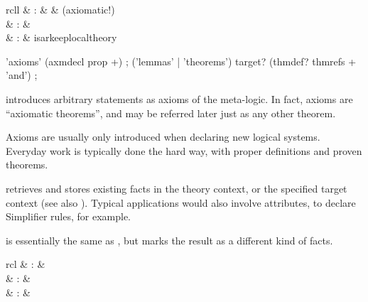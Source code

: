 \begin{isabellebody}
\begin{isamarkuptext}
\begin{descr}
  \end{descr}%
\end{isamarkuptext}%
\isamarkuptrue%
%
\isamarkuptrue%
%
\begin{isamarkuptext}%
\begin{matharray}{rcll}
     & : &  & (axiomatic!) \\
     & : &  \\
     & : & isarkeep{local{\dsh}theory} \\
  \end{matharray}

  \begin{rail}
    'axioms' (axmdecl prop +)
    ;
    ('lemmas' | 'theorems') target? (thmdef? thmrefs + 'and')
    ;
  \end{rail}

  \begin{descr}
  
  \item [\isa{\isacommand{axioms}}~\isa{a{\isacharcolon}\ {\isasymphi}}] introduces arbitrary
  statements as axioms of the meta-logic.  In fact, axioms are
  ``axiomatic theorems'', and may be referred later just as any other
  theorem.
  
  Axioms are usually only introduced when declaring new logical
  systems.  Everyday work is typically done the hard way, with proper
  definitions and proven theorems.
  
  \item [\isa{\isacommand{lemmas}}~\isa{a\ {\isacharequal}\ b\isactrlsub {\isadigit{1}}\ {\isasymdots}\ b\isactrlsub n}]
  retrieves and stores existing facts in the theory context, or the
  specified target context (see also ).  Typical
  applications would also involve attributes, to declare Simplifier
  rules, for example.
  
  \item [\isa{\isacommand{theorems}}] is essentially the same as , but marks the result as a different kind of facts.

  \end{descr}%
\end{isamarkuptext}%
\isamarkuptrue%
%
\isamarkuptrue%
%
\begin{isamarkuptext}%
\begin{matharray}{rcl}
     & : &  \\
     & : &  \\
     & : &  \\
  \end{matharray}


\end{isamarkuptext}
\end{isabellebody}
